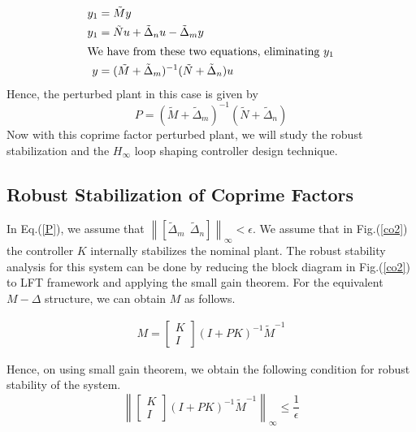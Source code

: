 \documentclass[a4paper,12pt]{article}
\newcommand\norm[1]{\left\lVert#1\right\rVert}
\begin{document}
	\begin{align}
	y_{1}&=\tilde{M}y\\
	y_{1}&=\tilde{N}u + \tilde{\Delta}_{n}u - \tilde{\Delta}_{m}y\\
	\intertext{We have from these two equations, eliminating $y_{1}$} 
	y&=(\tilde{M} + \tilde{\Delta}_{m})^{-1}(\tilde{N}+\tilde{\Delta}_{n})u
	\end{align}
	Hence, the perturbed plant in this case is given by
	\begin{equation}
		\label{P}
		P =(\tilde{M} + \tilde{\Delta}_{m})^{-1}(\tilde{N}+\tilde{\Delta}_{n})
	 \end{equation}
	 Now with this coprime factor perturbed plant, we will study the robust stabilization and the $H_{\infty}$ loop shaping controller design technique.
	\subsection{Robust Stabilization of Coprime Factors} In Eq.(\ref{P}), we assume that $\norm{[\tilde{\Delta}_{m} \:\: \tilde{\Delta}_{n}]}_{\infty} < \epsilon$. We assume that in Fig.(\ref{co2}) the controller $K$ internally stabilizes the nominal plant. The robust stability analysis for this system can be done by reducing the block diagram in Fig.(\ref{co2}) to LFT framework and applying the small gain theorem. For the equivalent $M-\Delta$ structure, we can obtain $M$ as follows.
	
	
	
	\begin{align*}
	M=\begin{bmatrix}
	K \\ I
	\end{bmatrix}
	(I+PK)^{-1}\tilde{M}^{-1}
	\end{align*}	 
	
	Hence, on using small gain theorem, we obtain the following condition for robust stability of the system.
	\begin{equation}
	\norm{\begin{bmatrix}
	K \\ I
	\end{bmatrix}
	(I+PK)^{-1}\tilde{M}^{-1}}_{\infty} \leq \frac{1}{\epsilon}	
	\end{equation}
	
\end{document}
